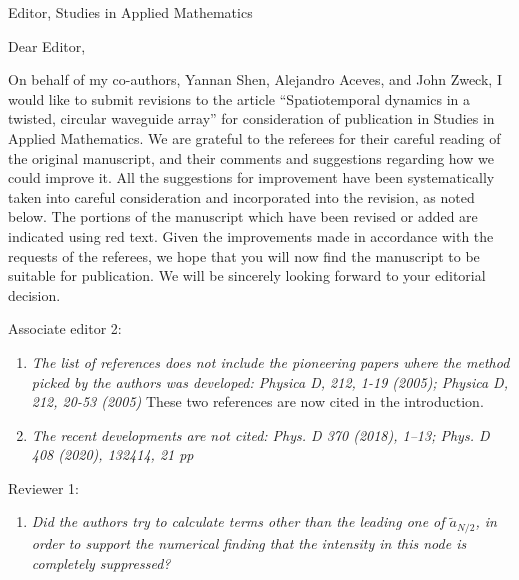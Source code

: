 \documentclass[11pt]{letter}
\begin{document}
\address{Ross Parker \\
Department of Mathematics \\
Southern Methodist University \\
Dallas, TX 75275 \\
\texttt{rhparker@smu.edu}}%
\signature{Ross Parker}
\begin{letter}{Editor, Studies in Applied Mathematics}

\opening{Dear Editor,}

On behalf of my co-authors, Yannan Shen, Alejandro Aceves, and John Zweck, I would like to submit revisions to the article ``Spatiotemporal dynamics in a twisted, circular waveguide array'' for consideration of publication in Studies in Applied Mathematics. We are grateful to the referees for their careful reading of the original manuscript, and their comments and suggestions regarding how we could improve it. All the suggestions for improvement have been systematically taken into careful consideration and incorporated into the revision, as noted below. The portions of the manuscript which have been revised or added are indicated using red text. Given the improvements made in accordance with the requests of the referees, we hope that you will now find the manuscript to be suitable for publication. We will be sincerely looking forward to your editorial decision.

Associate editor 2:
\begin{enumerate}
    \item \emph{The list of references does not include the pioneering papers where the method picked by the authors was developed: Physica D, 212, 1-19 (2005); Physica D, 212, 20-53 (2005)} These two references are now cited in the introduction.
    \vspace{4mm}

    \item \emph{The recent developments are not cited: Phys. D 370 (2018), 1–13;  Phys. D 408 (2020), 132414, 21 pp}
    \vspace{4mm}
\end{enumerate}

Reviewer 1:
\begin{enumerate}
    \item \emph{Did the authors try to calculate terms other than the leading one of $\tilde{a}_{N/2}$, in order to support the numerical finding that the intensity in this node is completely suppressed?}
    \vspace{4mm}


\end{enumerate}
\end{letter}
\end{document}
